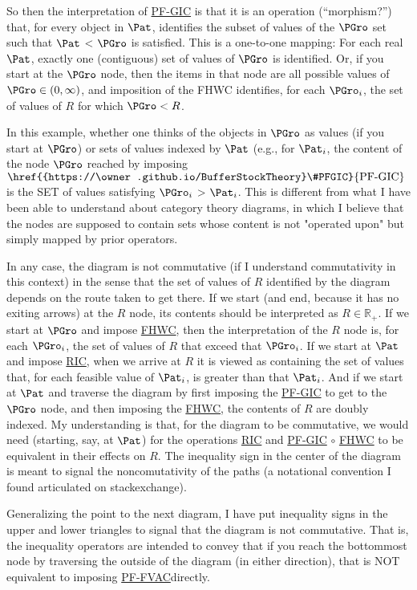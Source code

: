 \documentclass[\econtexRoot/BufferStockTheory]{subfiles}
\newcommand{\BSTlinkTo}{https://\owner.github.io/BufferStockTheory}
\renewcommand{\FHWC}{\href{{\BSTlinkTo}FHWC}{\textrm{FHWC}}}
\renewcommand{\FHWC}{\href{{\BSTlinkTo}\#FHWC}{\textrm{FHWC}}}
\renewcommand{\PFGIC}{\href{{\BSTlinkTo}\#PFGIC}{\textrm{PF-GIC}}}
\renewcommand{\RIC}{\href{{\BSTlinkTo}\#RIC}{\textrm{RIC}}}
\renewcommand{\PFFVAC}{\href{{\BSTlinkTo}\#PFFVAC}{\textrm{PF-FVAC}}}
\begin{document}
\begin{Private}
So then the interpretation of {\PFGIC} is that it is an operation (``morphism?'') that, for every object in $\Pat$, identifies the subset of values of the $\PGro$ set such that $\Pat$ < $\PGro$ is satisfied. This is a one-to-one mapping: For each real $\Pat$, exactly one (contiguous) set of values of $\PGro$ is identified. Or, if you start at the $\PGro$ node, then the items in that node are all possible values of $\PGro \in (0,\infty)$, and imposition of the FHWC identifies, for each $\PGro_{i}$, the set of values of ${R}$ for which $\PGro < {R}$.

In this example, whether one thinks of the objects in $\PGro$ as values (if you start at $\PGro$) or sets of values indexed by $\Pat$ (e.g., for $\Pat_i$, the content of the node $\PGro$ reached by imposing $\PFGIC$ is the SET of values satisfying $\PGro_{i} $ > $\Pat_i$. This is different from what I have been able to understand about category theory diagrams, in which I believe that the nodes are supposed to contain sets whose content is not "operated upon" but simply mapped by prior operators.

In any case, the diagram is not commutative (if I understand commutativity in this context) in the sense that the set of values of ${R}$ identified by the diagram depends on the route taken to get there.  If we start (and end, because it has no exiting arrows) at the ${R}$ node, its contents should be interpreted as ${R} \in \mathbb{R}_{+}$.  If we start at $\PGro$ and impose {\FHWC}, then the interpretation of the ${R}$ node is, for each $\PGro_{i}$, the set of values of ${R}$ that exceed that $\PGro_{i}$.  If we start at $\Pat$ and impose {\RIC}, when we arrive at ${R}$ it is viewed as containing the set of values that, for each feasible value of $\Pat_{i}$, is greater than that $\Pat_{i}$. And if we start at $\Pat$ and traverse the diagram by first imposing the {\PFGIC} to get to the $\PGro$ node, and then imposing the {\FHWC}, the contents of ${R}$ are doubly indexed. My understanding is that, for the diagram to be commutative, we would need (starting, say, at $\Pat$) for the operations {\RIC} and {\PFGIC} $\circ$ {\FHWC} to be equivalent in their effects on ${R}$. The inequality sign in the center of the diagram is meant to signal the noncomutativity of the paths (a notational convention I found articulated on stackexchange).

Generalizing the point to the next diagram, I have put inequality signs in the upper and lower triangles to signal that the diagram is not commutative. That is, the inequality operators are intended to convey that if you reach the bottommost node by traversing the outside of the diagram (in either direction), that is NOT equivalent to imposing \PFFVAC directly.


\end{Private}
\end{document}

